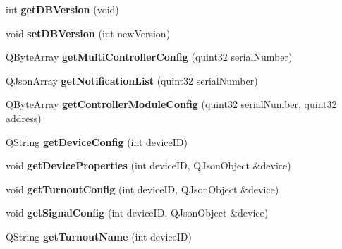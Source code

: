\begin{DoxyCompactItemize}
\item 
\mbox{\label{class_database_a40123ea0706f6bd80a66f4c03026aaae}} 
int {\bfseries get\+D\+B\+Version} (void)
\item 
\mbox{\label{class_database_ac661c2459b9a7ac22c882971be8ee3b8}} 
void {\bfseries set\+D\+B\+Version} (int new\+Version)
\item 
\mbox{\label{class_database_ae92b8bfa260ee01d7e2bb411917f3049}} 
Q\+Byte\+Array {\bfseries get\+Multi\+Controller\+Config} (quint32 serial\+Number)
\item 
\mbox{\label{class_database_aa458cd303347f4f10b74c2c9b3661084}} 
Q\+Json\+Array {\bfseries get\+Notification\+List} (quint32 serial\+Number)
\item 
\mbox{\label{class_database_aaabd22c307d3bdb68148296d636758cf}} 
Q\+Byte\+Array {\bfseries get\+Controller\+Module\+Config} (quint32 serial\+Number, quint32 address)
\item 
\mbox{\label{class_database_a702c94a5d8c9796ad5e4e216ae9278fa}} 
Q\+String {\bfseries get\+Device\+Config} (int device\+ID)
\item 
\mbox{\label{class_database_a26943586c348a996d31c722cd10c8bc2}} 
void {\bfseries get\+Device\+Properties} (int device\+ID, Q\+Json\+Object \&device)
\item 
\mbox{\label{class_database_a26992f37246c3c2383716704398c3403}} 
void {\bfseries get\+Turnout\+Config} (int device\+ID, Q\+Json\+Object \&device)
\item 
\mbox{\label{class_database_a14e593519bd9fe8c414083d633906786}} 
void {\bfseries get\+Signal\+Config} (int device\+ID, Q\+Json\+Object \&device)
\item 
\mbox{\label{class_database_a015c1d3e3c83c9c66fe4f86dbff656a6}} 
Q\+String {\bfseries get\+Turnout\+Name} (int device\+ID)
\item 
\mbox{\label{class_database_aefd61c538939ce9b79c85c2df6914447}} 

\end{DoxyCompactItemize}

